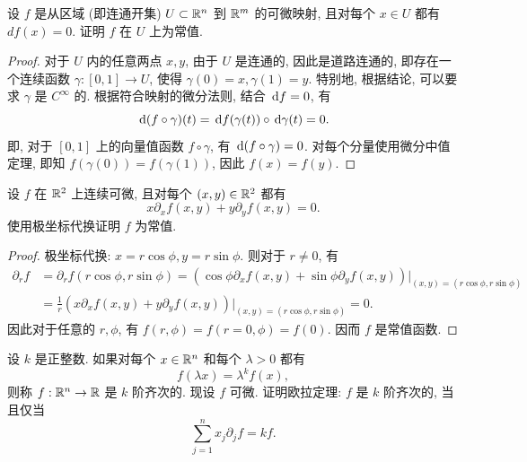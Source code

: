 \documentclass{article}
\begin{document}
\begin{problem}
  设 $f$ 是从区域 (即连通开集) $U\subset\mathbb{R}^n$ 到 $\mathbb{R}^m$ 的可微映射, 且对每个 $x\in U$ 都有 $df(x)=0$. 证明 $f$ 在 $U$ 上为常值.
\end{problem}

\begin{proof}
	对于 $U$ 内的任意两点 $x,y$, 由于 $U$ 是连通的, 因此是道路连通的, 即存在一个连续函数 $\gamma: [0,1] \to U$, 使得 $\gamma(0) = x, \gamma(1) = y$. 特别地, 根据结论, 可以要求 $\gamma$ 是 $C^\infty$ 的. 根据符合映射的微分法则, 结合 $\,\mathrm{d} f = 0$, 有
	\[ \,\mathrm{d}(f \circ \gamma)(t) = \,\mathrm{d} f(\gamma(t)) \circ \,\mathrm{d} \gamma(t) = 0. \]
	即, 对于 $[0,1]$ 上的向量值函数 $f \circ \gamma$, 有 $\,\mathrm{d} (f \circ \gamma) = 0$. 对每个分量使用微分中值定理, 即知 $f(\gamma(0)) = f(\gamma(1))$, 因此 $f(x) = f(y)$.
\end{proof}



\begin{problem}
  设 $f$ 在 $\mathbb{R}^2$ 上连续可微, 且对每个 $(x,y)\in\mathbb{R}^2$ 都有
  \[
    x\partial_x f(x,y)+y\partial_y f(x,y)=0.
  \]
  使用极坐标代换证明 $f$ 为常值.
\end{problem}

\begin{proof}
	极坐标代换: $x = r\cos\phi, y = r\sin\phi$. 则对于 $r\neq 0$, 有
	\begin{align*}
		\partial_rf
		&= \partial_rf(r\cos\phi, r\sin\phi)
		= \left( \cos\phi \partial_xf(x,y)+ \sin\phi \partial_yf(x,y) \right)\Big|_{(x,y) = (r\cos\phi, r\sin\phi)} \\
		&= \frac{1}{r} \left( x \partial_xf(x,y)+ y \partial_yf(x,y) \right)\Big|_{(x,y) = (r\cos\phi, r\sin\phi)}
		= 0.
	\end{align*}
	因此对于任意的 $r,\phi$, 有 $f(r,\phi) = f(r=0,\phi) = f(0)$. 因而 $f$ 是常值函数.
\end{proof}



\begin{problem}
  设 $k$ 是正整数. 如果对每个 $x\in\mathbb{R}^n$ 和每个 $\lambda>0$ 都有
  \[
    f(\lambda x)=\lambda^k f(x),
  \]
  则称 $f:\mathbb{R}^n\to\mathbb{R}$ 是 $k$ 阶齐次的. 现设 $f$ 可微. 证明欧拉定理: $f$ 是 $k$ 阶齐次的, 当且仅当
  \[
    \sum_{j=1}^n x_j\partial_j f=kf.
  \]
\end{problem}
\end{document}
